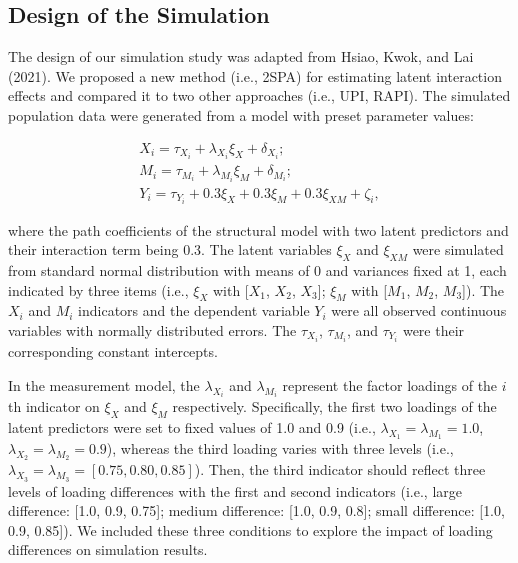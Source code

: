\documentclass[
  man]{apa7}
\begin{document}
\hypertarget{design-of-the-simulation}{%
\subsection{Design of the Simulation}\label{design-of-the-simulation}}

The design of our simulation study was adapted from Hsiao, Kwok, and Lai (2021). We proposed a new method (i.e., 2SPA) for estimating latent interaction effects and compared it to two other approaches (i.e., UPI, RAPI). The simulated population data were generated from a model with preset parameter values:

\begin{equation}
\begin{gathered}
X_{i} = \tau_{X_{i}} + \lambda_{X_{i}}\xi_{X} + \delta_{X_{i}};\\
M_{i} = \tau_{M_{i}} + \lambda_{M_{i}}\xi_{M} + \delta_{M_{i}};\\
Y_{i} = \tau_{Y_{i}} + 0.3\xi_{X} + 0.3\xi_{M} + 0.3\xi_{XM} + \zeta_{i},
\end{gathered}
\end{equation}

where the path coefficients of the structural model with two latent predictors and their interaction term being 0.3. The latent variables \(\xi_{X}\) and \(\xi_{XM}\) were simulated from standard normal distribution with means of 0 and variances fixed at 1, each indicated by three items (i.e., \(\xi_{X}\) with {[}\(X_{1}\), \(X_{2}\), \(X_{3}\){]}; \(\xi_{M}\) with {[}\(M_{1}\), \(M_{2}\), \(M_{3}\){]}). The \(X_{i}\) and \(M_{i}\) indicators and the dependent variable \(Y_{i}\) were all observed continuous variables with normally distributed errors. The \(\tau_{X_{i}}\), \(\tau_{M_{i}}\), and \(\tau_{Y_{i}}\) were their corresponding constant intercepts.

In the measurement model, the \(\lambda_{X_{i}}\) and \(\lambda_{M_{i}}\) represent the factor loadings of the \(i\)th
indicator on \(\xi_{X}\) and \(\xi_{M}\) respectively. Specifically, the first two loadings of the latent predictors were set to fixed values of 1.0 and 0.9 (i.e., \(\lambda_{X_{1}} = \lambda_{M_{1}} = 1.0\), \(\lambda_{X_{2}} = \lambda_{M_{2}} = 0.9\)), whereas the third loading varies with three levels (i.e., \(\lambda_{X_{3}} = \lambda_{M_{3}} = [0.75, 0.80, 0.85]\)). Then, the third indicator should reflect three levels of loading differences with the first and second indicators (i.e., large difference: {[}1.0, 0.9, 0.75{]}; medium difference: {[}1.0, 0.9, 0.8{]}; small difference: {[}1.0, 0.9, 0.85{]}). We included these three conditions to explore the impact of loading differences on simulation results.
\end{document}
